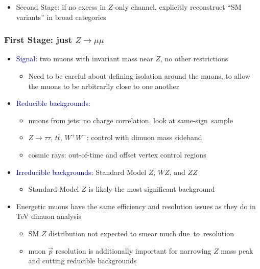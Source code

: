 \documentclass[compress]{beamer}
\begin{document}
\begin{frame}
\begin{itemize}
\item Second Stage: if no excess in $Z$-only channel, explicitly
  reconstruct ``SM variants'' in broad categories

\end{itemize}
\end{frame}

\begin{frame}
\frametitle{First Stage: just $Z\to\mu\mu$}
\begin{itemize}\setlength{\itemsep}{0.2 cm}
\item \textcolor{darkblue}{Signal:} two muons with invariant mass near $Z$, no other restrictions
\begin{itemize}
\item Need to be careful about defining isolation around the muons, to
  allow the muons to be arbitrarily close to one another
\end{itemize}

\item \textcolor{darkblue}{Reducible backgrounds:}
\begin{itemize}\setlength{\itemsep}{0.1 cm}
\item muons from jets: no charge correlation, look at \mbox{same-sign sample\hspace{-1 cm}}
\item $Z\to\tau\tau$, $t\bar{t}$, $W^+W^-$: control with dimuon mass sideband
\item cosmic rays: out-of-time and offset vertex control regions
\end{itemize}

\item \textcolor{darkblue}{Irreducible backgrounds:} Standard Model $Z$, $WZ$, and $ZZ$
\begin{itemize}
\item Standard Model $Z$ is likely the most significant background
\end{itemize}

\item Energetic muons have the same efficiency and
  resolution issues as they do in TeV dimuon analysis
\begin{itemize}
\item SM $Z$ distribution not expected to smear much \mbox{due to resolution\hspace{-1 cm}}
\item muon $\vec{p}$ resolution is additionally important for narrowing $Z$ mass peak
  and cutting reducible backgrounds
\end{itemize}
\end{itemize}
\end{frame}
\end{document}
